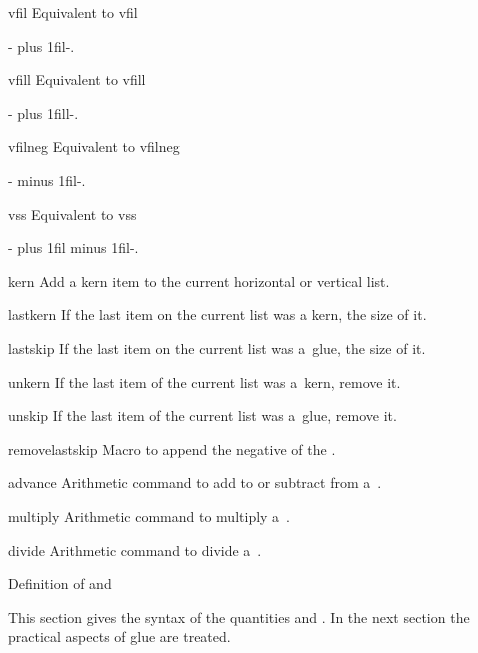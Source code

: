\item vfil 
      Equivalent to 
      \csterm vfil\par
      \ver-\vskip 0cm plus 1fil-.

\item vfill 
      Equivalent to 
      \csterm vfill\par
      \ver-\vskip 0cm plus 1fill-.

\item vfilneg 
      Equivalent to 
      \csterm vfilneg\par
      \ver-\vskip 0cm minus 1fil-.

\item vss 
      Equivalent to 
      \csterm vss\par
      \ver-\vskip 0cm plus 1fil minus 1fil-.

\item kern  
      Add a kern item to the current horizontal or vertical list.

\item lastkern 
      If the last item on the current list was a kern, the size of it.

\item lastskip 
      If the last item on the current list was a~glue, the size of it.

\item unkern 
      If the last item of the current list was a~kern, remove it.

\item unskip 
      If the last item of the current list was a~glue, remove it.

\item removelastskip
      Macro to append the negative of the .

\item advance 
      Arithmetic command to add to or subtract from
      a~.

\item multiply 
      Arithmetic command to multiply a~.

\item divide 
      Arithmetic command to divide a~.


\inventstop



\point Definition of  and 

This section gives
the syntax of the quantities
 and . 
In the next section the practical aspects of glue are treated.

